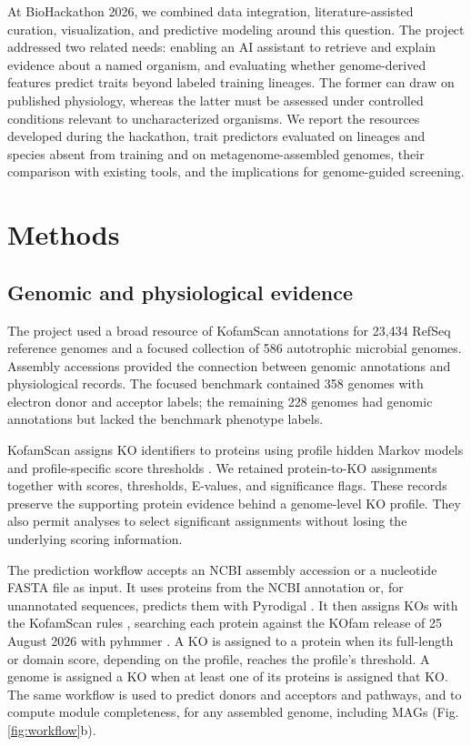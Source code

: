 \documentclass[10pt,a4paper,onecolumn]{article}
\begin{document}
At BioHackathon 2026, we combined data integration, literature-assisted
curation, visualization, and predictive modeling around this question.
The project addressed two related needs: enabling an AI assistant to
retrieve and explain evidence about a named organism, and evaluating
whether genome-derived features predict traits beyond labeled training
lineages. The former can draw on published physiology, whereas the
latter must be assessed under controlled conditions relevant to
uncharacterized organisms. We report the resources developed during the
hackathon, trait predictors evaluated on lineages and species absent
from training and on metagenome-assembled genomes, their comparison with
existing tools, and the implications for genome-guided screening.

\section{Methods}\label{methods}

\subsection{Genomic and physiological
evidence}\label{genomic-and-physiological-evidence}

The project used a broad resource of KofamScan annotations for 23,434
RefSeq reference genomes and a focused collection of 586 autotrophic
microbial genomes. Assembly accessions provided the connection between
genomic annotations and physiological records. The focused benchmark
contained 358 genomes with electron donor and acceptor labels; the
remaining 228 genomes had genomic annotations but lacked the benchmark
phenotype labels.

KofamScan assigns KO identifiers to proteins using profile hidden Markov
models and profile-specific score thresholds \autocite{Aramaki2020}. We
retained protein-to-KO assignments together with scores, thresholds,
E-values, and significance flags. These records preserve the supporting
protein evidence behind a genome-level KO profile. They also permit
analyses to select significant assignments without losing the underlying
scoring information.

The prediction workflow accepts an NCBI assembly accession or a
nucleotide FASTA file as input. It uses proteins from the NCBI
annotation or, for unannotated sequences, predicts them with Pyrodigal
\autocite{Hyatt2010,Larralde2022}. It then assigns KOs with the
KofamScan rules \autocite{Aramaki2020}, searching each protein against
the KOfam release of 25 August 2026 with pyhmmer
\autocite{Larralde2023}. A KO is assigned to a protein when its
full-length or domain score, depending on the profile, reaches the
profile's threshold. A genome is assigned a KO when at least one of its
proteins is assigned that KO. The same workflow is used to predict
donors and acceptors and pathways, and to compute module completeness,
for any assembled genome, including MAGs (Fig. \ref{fig:workflow}b).
\end{document}
